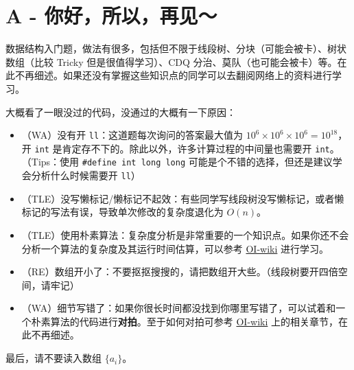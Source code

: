 \documentclass{ctexart}
\begin{document}
\pagestyle{empty}

\section*{A - 你好，所以，再见～}

数据结构入门题，做法有很多，包括但不限于线段树、分块（可能会被卡）、树状数组（比较 Tricky 但是很值得学习）、CDQ 分治、莫队（也可能会被卡）等。在此不再细述。如果还没有掌握这些知识点的同学可以去翻阅网络上的资料进行学习。

大概看了一眼没过的代码，没通过的大概有一下原因：

\begin{itemize}
    \item （WA）没有开 \texttt{ll}：这道题每次询问的答案最大值为 \(10^6\times10^6\times10^6=10^{18}\)，开 \texttt{int} 是肯定存不下的。除此以外，许多计算过程的中间量也需要开 \texttt{int}。（Tips：使用 \texttt{\#define int long long} 可能是个不错的选择，但还是建议学会分析什么时候需要开 \texttt{ll}）
    \item （TLE）没写懒标记/懒标记不起效：有些同学写线段树没写懒标记，或者懒标记的写法有误，导致单次修改的复杂度退化为 \(O(n)\)。
    \item （TLE）使用朴素算法：复杂度分析是非常重要的一个知识点。如果你还不会分析一个算法的复杂度及其运行时间估算，可以参考 \href{https://oi-wiki.org/basic/complexity/}{OI-wiki} 进行学习。
    \item （RE）数组开小了：不要抠抠搜搜的，请把数组开大些。（线段树要开四倍空间，请牢记）
    \item （WA）细节写错了：如果你很长时间都没找到你哪里写错了，可以试着和一个朴素算法的代码进行\textbf{对拍}。至于如何对拍可参考 \href{https://oi-wiki.org/contest/common-tricks/#\%E5\%AF\%B9\%E6\%8B\%8D}{OI-wiki} 上的相关章节，在此不再细述。
\end{itemize}

最后，请不要读入数组 \(\lbrace a_i\rbrace\)。
\end{document}
